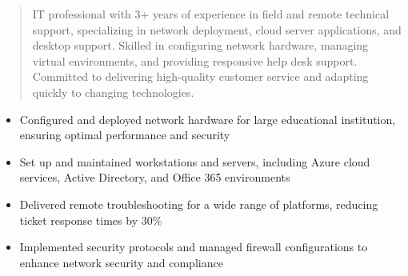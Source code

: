 



\makecvheader

\begin{quote}
  \noindent
  IT professional with 3+ years of experience in field and remote technical support, specializing in network deployment, cloud server applications, and desktop support. Skilled in configuring network hardware, managing virtual environments, and providing responsive help desk support. Committed to delivering high-quality customer service and adapting quickly to changing technologies.
\end{quote}

\par\smallskip
\noindent
\begin{minipage}{20cm}
  \begin{minipage}{9.75cm}
    \begin{itemize}
      \item Configured and deployed network hardware for large educational institution, ensuring optimal performance and security
      \item Set up and maintained workstations and servers, including Azure cloud services, Active Directory, and Office 365 environments
    \end{itemize}
  \end{minipage}
  \hfill
  \begin{minipage}{9.75cm}
    \begin{itemize}
      \item Delivered remote troubleshooting for a wide range of platforms, reducing ticket response times by 30\%
      \item Implemented security protocols and managed firewall configurations to enhance network security and compliance
    \end{itemize}
  \end{minipage}
\end{minipage}
\par\smallskip
\divider

